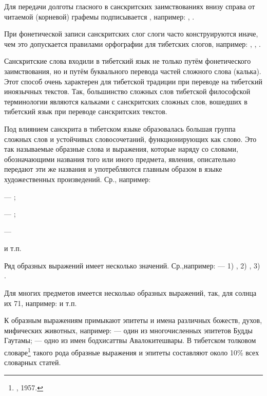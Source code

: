 Для передачи долготы гласного в санскритских заимствованиях внизу справа от читаемой (корневой) графемы подписывается , например: , .

При фонетической записи санскритских слог слоги часто конструируются иначе, чем это допускается правилами орфографии для тибетских слогов, например: , , .

Санскритские слова входили в тибетский язык не только путём фонетического заимствования, но и путём буквального перевода частей сложного слова (калька). Этот способ очень характерен для тибетской традиции при переводе на тибетский иноязычных текстов. Так, большинство сложных слов тибетской философской терминологии являются кальками с санскритских сложных слов, вошедших в тибетский язык при переводе санскритских текстов.

Под влиянием санскрита в тибетском языке обраэовалась большая группа сложных слов и устойчивых словосочетаний, функционирующих как слово. Это так называемые образные слова и выражения, которые наряду со словами, обозначающими названия того или иного предмета, явления, описательно передают эти же названия и употребляются главным образом в языке художественных произведений.
Ср., например:
\begin{prfsample}
	\item {} --- ;
	\item {} --- ;
	\item {} --- 	
\end{prfsample}
 и т.п.

Ряд образных выражений имеет несколько значений. Ср.,например:  --- 1) , 2) , 3) .

Для многих предметов имеется несколько образных выражений, так, для солнца их 71, например:  и т.п.

К образным выражениям примыкают эпитеты и имена различных божеств, духов, мифических животных, например:  --- один из многочисленных эпитетов Будды Гаутамы;  --- одно из имен бодхисаттвы Авалокитешвары. В тибетском толковом словаре\footnote[18]{, 1957.} такого рода образные выражения и эпитеты составляют около 10\% всех словарных статей.

